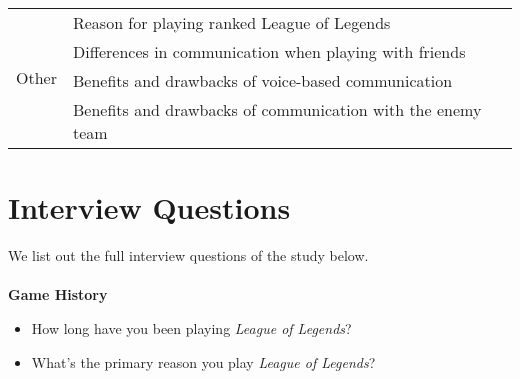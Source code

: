 \begin{table}[!htbp]
{\begin{tabular}{ll|l}
\multicolumn{2}{l|}{\multirow{4}{*}{Other}}                                                                                                                                                                                                                                                                            & Reason for playing ranked League of Legends                         \\ \cline{3-3} 
\multicolumn{2}{l|}{}                                                                                                                                                                                                                                                                                                  & Differences in communication when playing with friends              \\ \cline{3-3} 
\multicolumn{2}{l|}{}                                                                                                                                                                                                                                                                                                  & Benefits and drawbacks of voice-based communication                 \\ \cline{3-3} 
\multicolumn{2}{l|}{}                                                                                                                                                                                                                                                                                                  & Benefits and drawbacks of communication with the enemy team        \\
\bottomrule
\end{tabular}}
\label{tab:codebook}
\end{table}


\clearpage
\section{Interview Questions}
\label{appendix2}
We list out the full interview questions of the study below.
\\
\\
\textbf{Game History}
\begin{itemize}
\item How long have you been playing \textit{League of Legends}?
\item What’s the primary reason you play \textit{League of Legends}?
\end{itemize}


